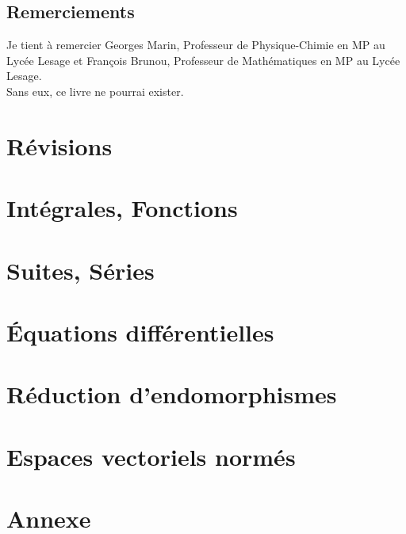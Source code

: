\documentclass[a4paper, titlepage, draft,twoside]{book}
\begin{document}
\chapter{Remerciements}
Je tient à remercier Georges Marin, Professeur de Physique-Chimie en MP au Lycée Lesage et François Brunou, Professeur de Mathématiques en MP au Lycée Lesage.\\
Sans eux, ce livre ne pourrai exister.\\
\mainmatter                   %
\part{Révisions}

\part{Intégrales, Fonctions}
\setcounter{chapter}{0}



\part{Suites, Séries}
\setcounter{chapter}{0}







\part{Équations différentielles}
\setcounter{chapter}{0}

\part{Réduction d'endomorphismes}
\setcounter{chapter}{0}


\part{Espaces vectoriels normés}
\setcounter{chapter}{0}






\appendix                     %
\part{Annexe}





\backmatter
\tableofcontents            %
\end{document}
